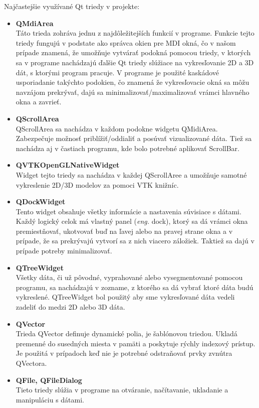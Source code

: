 \documentclass[a4paper,11pt,oneside]{article}%
\begin{document}
Najčastejšie využívané Qt triedy v projekte:
\begin{itemize}
\item \textbf{QMdiArea}\\ 
Táto trieda zohráva jednu z najdôležitejších funkcií v programe. Funkcie tejto triedy fungujú v podstate ako správca okien pre MDI okná, čo v našom prípade znamená, že umožňuje vytvárať podokná pomocou triedy, v ktorých sa v programe nachádzajú ďalšie Qt triedy slúžiace na vykresľovanie 2D a 3D dát, s ktorými program pracuje. V programe je použité kaskádové usporiadanie takýchto podokien, čo znamená že vykresľovacie okná sa môžu navzájom prekrývať, dajú sa minimalizovať/maximalizovať vrámci hlavného okna a zavrieť.

\item \textbf{QScrollArea} \\
QScrollArea sa nachádza v každom podokne widgetu QMidiArea. Zabezpečuje možnosť priblížiť/oddialiť a posúvať vizualizované dáta. Tiež sa nachádza aj v častiach programu, kde bolo potrebné aplikovať ScrollBar.

\item \textbf{QVTKOpenGLNativeWidget} \\
Widget tejto triedy sa nachádza v každej QScrollAree a umožňuje samotné vykreslenie 2D/3D modelov za pomoci VTK knižníc. 

\item \textbf{QDockWidget} \\
Tento widget obsahuje všetky informácie a nastavenia súvisiace s dátami. Každý logický celok má vlastný panel (\textit{eng.} dock), ktorý sa dá vrámci okna premiestňovať, ukotvovať buď na ľavej alebo na pravej strane okna a v prípade, že sa prekrývajú vytvorí sa z nich viacero záložiek. Taktiež sa dajú v prípade potreby minimalizovať.

\item \textbf{QTreeWidget} \\ 
Všetky dáta, či už pôvodné, vyprahované alebo vysegmentované pomocou programu, sa nachádzajú v zozname, z ktorého sa dá vybrať ktoré dáta budú vykreslené. QTreeWidget bol použitý aby sme vykresľované dáta vedeli zadeliť do medzi  2D alebo 3D dáta.

\item \textbf{QVector} \\
Trieda QVector definuje dynamické polia, je šablónovou triedou.
Ukladá premenné do susedných miesta v pamäti a poskytuje rýchly indexový prístup. Je použitá v prípadoch keď nie je potrebné odstraňovať prvky zvnútra QVectora.

\item \textbf{QFile, QFileDialog} \\
Tieto triedy slúžia v programe na otváranie, načítavanie, ukladanie a manipuláciu s dátami.

\end{itemize}
\end{document}
